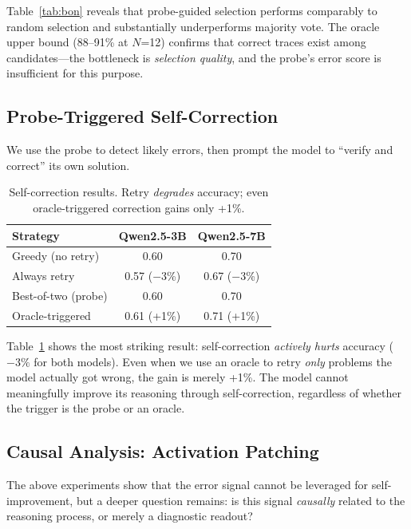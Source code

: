 \documentclass[11pt]{article}
\newcommand{\modelsmall}{Qwen2.5-3B}
\newcommand{\modelmed}{Qwen2.5-7B}
\begin{document}
Table~\ref{tab:bon} reveals that probe-guided selection performs comparably to random selection and substantially underperforms majority vote.
The oracle upper bound (88--91\% at $N$=12) confirms that correct traces exist among candidates---the bottleneck is \textit{selection quality}, and the probe's error score is insufficient for this purpose.

\subsection{Probe-Triggered Self-Correction}

We use the probe to detect likely errors, then prompt the model to ``verify and correct'' its own solution.

\begin{table}[t]
\centering
\small
\begin{tabular}{lcc}
\toprule
\textbf{Strategy} & \textbf{\modelsmall} & \textbf{\modelmed} \\
\midrule
Greedy (no retry) & 0.60 & 0.70 \\
Always retry & 0.57 ($-$3\%) & 0.67 ($-$3\%) \\
Best-of-two (probe) & 0.60 & 0.70 \\
Oracle-triggered & 0.61 (+1\%) & 0.71 (+1\%) \\
\bottomrule
\end{tabular}
\caption{Self-correction results. Retry \textit{degrades} accuracy; even oracle-triggered correction gains only +1\%.}
\label{tab:self_correction}
\end{table}

Table~\ref{tab:self_correction} shows the most striking result: self-correction \textit{actively hurts} accuracy ($-3\%$ for both models).
Even when we use an oracle to retry \textit{only} problems the model actually got wrong, the gain is merely +1\%.
The model cannot meaningfully improve its reasoning through self-correction, regardless of whether the trigger is the probe or an oracle.

\subsection{Causal Analysis: Activation Patching}
\label{sec:patching}

The above experiments show that the error signal cannot be leveraged for self-improvement, but a deeper question remains: is this signal \textit{causally} related to the reasoning process, or merely a diagnostic readout?
\end{document}
